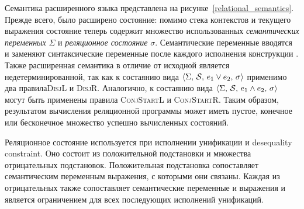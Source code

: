 Семантика расширенного языка представлена на рисунке~\ref{relational_semantics}. Прежде всего, было расширено состояние: помимо стека контекстов и текущего выражения состояние теперь содержит множество использованных {\it семантических переменных} $\Sigma$ и {\it реляционное состояние} $\sigma$. Семантические переменные вводятся и заменяют синтаксические переменные после каждого исполнения конструкции . Также расширенная семантика в отличие от исходной является недетерминированной, так как к состаянию вида $\left<{\Sigma,\,\mathcal S,\,e_1\vee e_2,\,\sigma}\right>$ применимо два правила\textsc{DisjL} и \textsc{DisjR}. Аналогично, к состаянию вида $\left<{\Sigma,\,\mathcal S,\,e_1\wedge e_2,\,\sigma}\right>$ могут быть применены правила \textsc{ConjStartL} и \textsc{ConjStartR}. Таким образом, результатом вычисления реляционной программы может иметь пустое, конечное или бесконечное множество  успешно вычисленных состояний.

Реляционное состояние используется при исполнении унификации и desequality constraint. Оно состоит из положительной подстановки и множества отрицательных подстановок. Положительная подстановка сопоставляет семантическим переменным выражения, с которыми они связаны. Каждая из отрицательных также сопоставляет семантические переменные и выражения и является ограничением для всех последующих исполнений унификаций.

